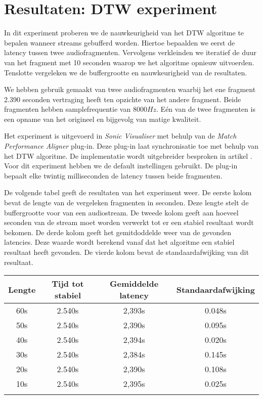 \chapter{Resultaten: DTW experiment}
\label{appendix-a}

In dit experiment proberen we de nauwkeurigheid van het DTW algoritme te bepalen wanneer streams gebufferd worden. Hiertoe bepaalden we eerst de latency tussen twee audiofragmenten. Vervolgens verkleinden we iteratief de duur van het fragment met 10 seconden waarop we het algoritme opnieuw uitvoerden. Tenslotte vergeleken we de buffergrootte en nauwkeurigheid van de resultaten.

We hebben gebruik gemaakt van twee audiofragmenten waarbij het ene fragment 2.390 seconden vertraging heeft ten opzichte van het andere fragment. Beide fragmenten hebben samplefrequentie van $8000Hz$. Eén van de twee fragmenten is een opname van het origineel en bijgevolg van matige kwaliteit.

Het experiment is uitgevoerd in \textit{Sonic Visualiser} met behulp van de \textit{Match Performance Aligner} plug-in. Deze plug-in laat synchronisatie toe met behulp van het DTW algoritme. De implementatie wordt uitgebreider besproken in artikel \cite{dixon2005match}. Voor dit experiment hebben we de default instellingen gebruikt. De plug-in bepaalt elke twintig milliseconden de latency tussen beide fragmenten.

De volgende tabel geeft de resultaten van het experiment weer. De eerste kolom bevat de lengte van de vergeleken fragmenten in seconden. Deze lengte stelt de buffergrootte voor van een audiostream. De tweede kolom geeft aan hoeveel seconden van de stream moet worden verwerkt tot er een stabiel resultaat wordt bekomen. De derde kolom geeft het gemitdoddelde weer van de gevonden latencies. Deze waarde wordt berekend vanaf dat het algoritme een stabiel resultaat heeft gevonden. De vierde kolom bevat de standaardafwijking van dit resultaat.\\

\begin{center}
\begin{tabular}{ c  c  c  c }
	\hline
	\textbf{Lengte} & \textbf{Tijd tot stabiel} & \textbf{Gemiddelde latency} & \textbf{Standaardafwijking} \\
	\hline
	60s & 2.540s & 2,393s & 0.048s \\
	50s & 2.540s & 2,390s & 0.095s \\
	40s & 2.540s & 2,394s & 0.020s \\
	30s & 2.540s & 2,384s & 0.145s \\
	20s & 2.540s & 2,390s & 0.108s \\
	10s & 2.540s & 2,395s & 0.025s \\
	\\
\end{tabular}\\
\end{center}

